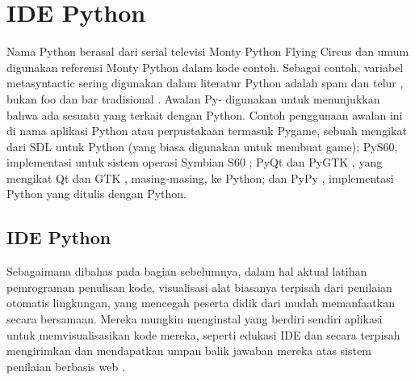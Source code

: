 \section{IDE Python}
Nama Python berasal dari serial televisi Monty Python Flying Circus dan umum digunakan referensi Monty Python dalam kode contoh. Sebagai contoh, variabel metasyntactic sering digunakan dalam literatur Python adalah spam dan telur , bukan foo dan bar tradisional .
Awalan Py- digunakan untuk menunjukkan bahwa ada sesuatu yang terkait dengan Python. Contoh penggunaan awalan ini di nama aplikasi Python atau perpustakaan termasuk Pygame, sebuah mengikat dari SDL untuk Python (yang biasa digunakan untuk membuat game); PyS60, implementasi untuk sistem operasi Symbian S60 ; PyQt dan PyGTK , yang mengikat Qt dan GTK , masing-masing, ke Python; dan PyPy , implementasi Python yang ditulis dengan Python. \cite{van2007python}

\subsection{IDE Python}
Sebagaimana dibahas pada bagian sebelumnya, dalam hal aktual latihan pemrograman penulisan kode, visualisasi alat biasanya terpisah dari penilaian otomatis lingkungan, yang mencegah peserta didik dari mudah memanfaatkan secara bersamaan. Mereka mungkin menginstal yang berdiri sendiri aplikasi untuk memvisualisasikan kode mereka, seperti edukasi IDE dan secara terpisah mengirimkan dan mendapatkan umpan balik jawaban mereka atas sistem penilaian berbasis web \cite{helminen2010jype}.


